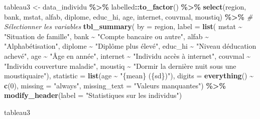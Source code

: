 \documentclass[
]{article}
\newenvironment{Shaded}{\begin{snugshade}}{\end{snugshade}}
\newcommand{\AttributeTok}[1]{\textcolor[rgb]{0.13,0.29,0.53}{#1}}
\newcommand{\CommentTok}[1]{\textcolor[rgb]{0.56,0.35,0.01}{\textit{#1}}}
\newcommand{\DecValTok}[1]{\textcolor[rgb]{0.00,0.00,0.81}{#1}}
\newcommand{\FunctionTok}[1]{\textcolor[rgb]{0.13,0.29,0.53}{\textbf{#1}}}
\newcommand{\NormalTok}[1]{#1}
\newcommand{\OtherTok}[1]{\textcolor[rgb]{0.56,0.35,0.01}{#1}}
\newcommand{\SpecialCharTok}[1]{\textcolor[rgb]{0.81,0.36,0.00}{\textbf{#1}}}
\newcommand{\StringTok}[1]{\textcolor[rgb]{0.31,0.60,0.02}{#1}}
\begin{document}
\begin{Shaded}
\begin{Highlighting}[]
\NormalTok{tableau3 }\OtherTok{\textless{}{-}}\NormalTok{ data\_individu }\SpecialCharTok{\%\textgreater{}\%}
\NormalTok{  labelled}\SpecialCharTok{::}\FunctionTok{to\_factor}\NormalTok{() }\SpecialCharTok{\%\textgreater{}\%} 
  \FunctionTok{select}\NormalTok{(region, bank, mstat, alfab, diplome, educ\_hi, age, internet, couvmal, moustiq) }\SpecialCharTok{\%\textgreater{}\%} \CommentTok{\# Sélectionner les variables}
  \FunctionTok{tbl\_summary}\NormalTok{(}
    \AttributeTok{by =}\NormalTok{ region,}
    \AttributeTok{label =} \FunctionTok{list}\NormalTok{(}
\NormalTok{      mstat }\SpecialCharTok{\textasciitilde{}} \StringTok{"Situation de famille"}\NormalTok{,}
\NormalTok{      bank }\SpecialCharTok{\textasciitilde{}} \StringTok{"Compte bancaire ou autre"}\NormalTok{,}
\NormalTok{      alfab }\SpecialCharTok{\textasciitilde{}} \StringTok{"Alphabétisation"}\NormalTok{,}
\NormalTok{      diplome }\SpecialCharTok{\textasciitilde{}} \StringTok{"Diplôme plus élevé"}\NormalTok{,}
\NormalTok{      educ\_hi }\SpecialCharTok{\textasciitilde{}} \StringTok{"Niveau d\textquotesingle{}éducation achevé"}\NormalTok{,}
\NormalTok{      age }\SpecialCharTok{\textasciitilde{}} \StringTok{"Âge en année"}\NormalTok{,}
\NormalTok{      internet }\SpecialCharTok{\textasciitilde{}} \StringTok{"Individu accès à internet"}\NormalTok{,}
\NormalTok{      couvmal }\SpecialCharTok{\textasciitilde{}} \StringTok{"Individu couverture maladie"}\NormalTok{,}
\NormalTok{      moustiq }\SpecialCharTok{\textasciitilde{}} \StringTok{"Dormir la dernière nuit sous une moustiquaire"}\NormalTok{),}
     \AttributeTok{statistic =} \FunctionTok{list}\NormalTok{(age }\SpecialCharTok{\textasciitilde{}} \StringTok{"\{mean\} (\{sd\})"}\NormalTok{),}
     \AttributeTok{digits =} \FunctionTok{everything}\NormalTok{() }\SpecialCharTok{\textasciitilde{}} \FunctionTok{c}\NormalTok{(}\DecValTok{0}\NormalTok{), }
     \AttributeTok{missing =} \StringTok{"always"}\NormalTok{, }
     \AttributeTok{missing\_text =} \StringTok{"Valeurs manquantes"}\NormalTok{) }\SpecialCharTok{\%\textgreater{}\%}
     \FunctionTok{modify\_header}\NormalTok{(}\AttributeTok{label =} \StringTok{"Statistiques sur les individus"}\NormalTok{) }

\NormalTok{tableau3}
\end{Highlighting}
\end{Shaded}
\end{document}

